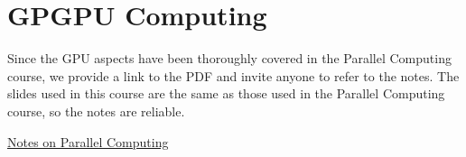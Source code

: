 \section{GPGPU Computing}

Since the GPU aspects have been thoroughly covered in the Parallel Computing course, we provide a link to the PDF and invite anyone to refer to the notes. The slides used in this course are the same as those used in the Parallel Computing course, so the notes are reliable.

\begin{center}
    \href{https://polimi-hpc-e-notes-projects-andrevale69.github.io/HPC-E-PoliMI-university-notes/parallel-computing/notes/parallel-computing.pdf}{Notes on Parallel Computing} \vspace{2em} 
\end{center}